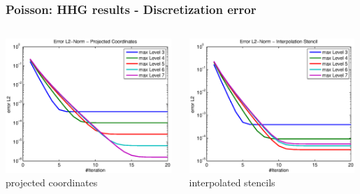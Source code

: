 \documentclass[t,compress=false,usepdftitle=false]{beamer}
\begin{document}
%
%
\begin{frame}\frametitle{Poisson: HHG results - Discretization error}

\begin{columns}[T] 
\begin{column}[T]{5.8cm} 
  \centering
  \includegraphics[width=0.98\textwidth]{spherepoisson_errorEuc_ProjCoords}\\
  projected coordinates
\end{column}\hfill
\begin{column}[T]{5.8cm} 
  \centering
  \includegraphics[width=0.98\textwidth]{spherepoisson_errorEuc_InterpolationStencil}\\
  interpolated stencils
\end{column}
\end{columns}
\vspace{0.5cm}
\centering

\end{frame}
\end{document}

